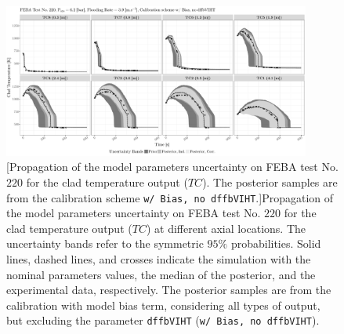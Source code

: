 \clearpage
\begin{figure}
	\centering
	\includegraphics[width=0.90\textwidth]{../figures/chapter5/figures/plotTraceUQPosteriorAllDiscCenteredNoParam8TC220}
		[Propagation of the model parameters uncertainty on FEBA test No. $220$ for the clad temperature output ($TC$). The posterior samples are from the calibration scheme \texttt{w/ Bias, no dffbVIHT}.]{Propagation of the model parameters uncertainty on FEBA test No. $220$ for the clad temperature output ($TC$) at different axial locations. The uncertainty bands refer to the symmetric $95\%$ probabilities. Solid lines, dashed lines, and crosses indicate the simulation with the nominal parameters values, the median of the posterior, and the experimental data, respectively. The posterior samples are from the calibration with model bias term, considering all types of output, but excluding the parameter \texttt{dffbVIHT} (\texttt{w/ Bias, no dffbVIHT}).}
	\label{fig:ch5_plot_trace_uq_post_tc_220_noparam8}
\end{figure}
\clearpage

